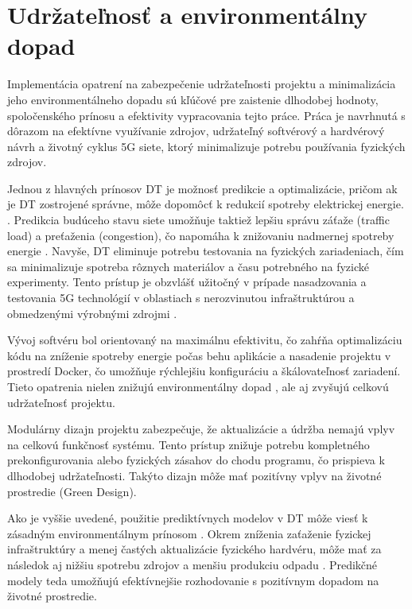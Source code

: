 \section{Udržateľnosť a environmentálny dopad}
Implementácia opatrení na zabezpečenie udržateľnosti projektu a minimalizácia jeho environmentálneho dopadu sú kľúčové pre zaistenie dlhodobej hodnoty, spoločenského prínosu a efektivity vypracovania tejto práce. Práca je navrhnutá s dôrazom na efektívne využívanie zdrojov, udržateľný softvérový a hardvérový návrh a životný cyklus 5G siete, ktorý minimalizuje potrebu používania fyzických zdrojov.

Jednou z hlavných prínosov DT je možnosť predikcie a optimalizácie, pričom ak je DT zostrojené správne, môže dopomôcť k redukcií spotreby elektrickej energie. \cite{DT_edge_networks_IoT}. Predikcia budúceho stavu siete umožňuje taktiež lepšiu správu záťaže (traffic load) a preťaženia (congestion), čo napomáha k znižovaniu nadmernej spotreby energie \cite{malaysia_enviro}. Navyše, DT eliminuje potrebu testovania na fyzických zariadeniach, čím sa minimalizuje spotreba rôznych materiálov \cite{enviro_raw_materials} a času potrebného na fyzické experimenty. Tento prístup je obzvlášť užitočný v prípade nasadzovania a testovania 5G technológií v oblastiach s nerozvinutou infraštruktúrou a obmedzenými výrobnými zdrojmi \cite{huaweii_i_cities}.

Vývoj softvéru bol orientovaný na maximálnu efektivitu, čo zahŕňa optimalizáciu kódu na zníženie spotreby energie počas behu aplikácie a nasadenie projektu v prostredí Docker, čo umožňuje rýchlejšiu konfiguráciu a škálovateľnosť zariadení. Tieto opatrenia nielen znižujú environmentálny dopad \cite{docker_enviro}\cite{docker_enviro_2}, ale aj zvyšujú celkovú udržateľnosť projektu.

Modulárny dizajn \cite{modular_sw} projektu zabezpečuje, že aktualizácie a údržba nemajú vplyv na celkovú funkčnosť systému. Tento prístup znižuje potrebu kompletného prekonfigurovania alebo fyzických zásahov do chodu programu, čo prispieva k dlhodobej udržateľnosti. Takýto dizajn môže mať pozitívny vplyv na životné prostredie \cite{modular_sw} (Green Design).

Ako je vyššie uvedené, použitie prediktívnych modelov v DT môže viesť k zásadným environmentálnym prínosom \cite{enviro}. Okrem zníženia zaťaženie fyzickej infraštruktúry a menej častých aktualizácie fyzického hardvéru, môže mať za následok aj nižšiu spotrebu zdrojov a menšiu produkciu odpadu \cite{enviro_raw_materials}. Predikčné modely teda umožňujú efektívnejšie rozhodovanie s pozitívnym dopadom na životné prostredie.